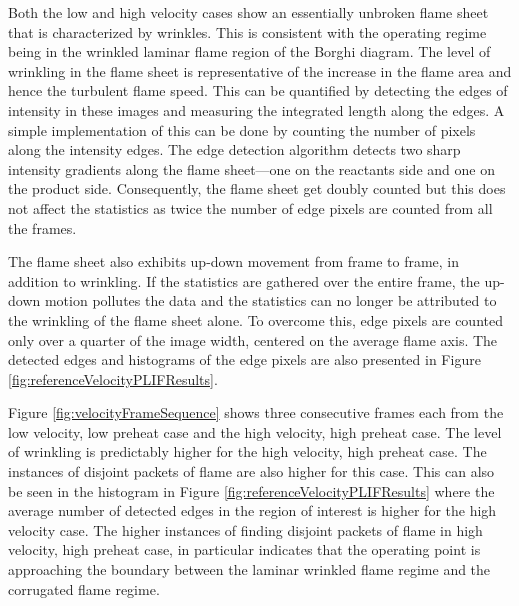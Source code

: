 

Both the low and high velocity cases show an essentially unbroken flame sheet that is characterized by wrinkles.
This is consistent with the operating regime being in the wrinkled laminar flame region of the Borghi diagram.
The level of wrinkling in the flame sheet is representative of the increase in the flame area and hence the turbulent flame speed.
This can be quantified by detecting the edges of intensity in these images and measuring the integrated length along the edges.
A simple implementation of this can be done by counting the number of pixels along the intensity edges.
The edge detection algorithm detects two sharp intensity gradients along the flame sheet---one on the reactants side and one on the product side.
Consequently, the flame sheet get doubly counted but this does not affect the statistics as twice the number of edge pixels are counted from all the frames.

The flame sheet also exhibits up-down movement from frame to frame, in addition to wrinkling.
If the statistics are gathered over the entire frame, the up-down motion pollutes the data and the statistics can no longer be attributed to the wrinkling of the flame sheet alone.
To overcome this, edge pixels are counted only over a quarter of the image width, centered on the average flame axis.
The detected edges and histograms of the edge pixels are also presented in Figure \ref{fig:referenceVelocityPLIFResults}.

Figure \ref{fig:velocityFrameSequence} shows three consecutive frames each from the low velocity, low preheat case and the high velocity, high preheat case.
The level of wrinkling is predictably higher for the high velocity, high preheat case.
The instances of disjoint packets of flame are also higher for this case.
This can also be seen in the histogram in Figure \ref{fig:referenceVelocityPLIFResults} where the average number of detected edges in the region of interest is higher for the high velocity case.
The higher instances of finding disjoint packets of flame in high velocity, high preheat case, in particular indicates that the operating point is approaching the boundary between the laminar wrinkled flame regime and the corrugated flame regime.



